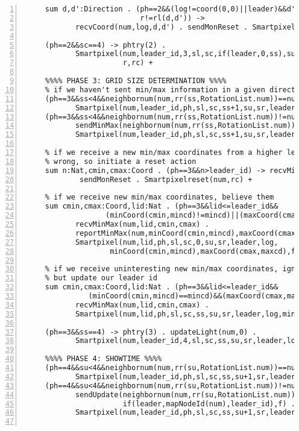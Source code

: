 \begin{Verbatim}[frame=lines,numbers=left,fontfamily=courier,fontsize=\footnotesize]
     % if we receive a position and the coordinates are ok but the direction is not, reset
     sum d,d':Direction . (ph==2&&(log!=coord(0,0)||leader)&&d'==rl(d,RotationList.num)&&
                           r!=rl(d,d')) ->
            recvCoord(num,log,d,d') . sendMonReset . Smartpixelreset(num,rc) +

     (ph==2&&sc==4) -> phtry(2) .
            Smartpixel(num,leader_id,3,sl,sc,if(leader,0,ss),su,sr,leader,log,log,log,f,
                       r,rc) +

     %%%% PHASE 3: GRID SIZE DETERMINATION %%%%
     % if we haven't sent min/max information in a given direction, do so
     (ph==3&&ss<4&&neighbornum(num,rr(ss,RotationList.num))==num) -> intern .
            Smartpixel(num,leader_id,ph,sl,sc,ss+1,su,sr,leader,log,mincd,maxcd,f,r,rc) +
     (ph==3&&ss<4&&neighbornum(num,rr(ss,RotationList.num))!=num) ->
            sendMinMax(neighbornum(num,rr(ss,RotationList.num)),leader_id,mincd,maxcd) .
            Smartpixel(num,leader_id,ph,sl,sc,ss+1,su,sr,leader,log,mincd,maxcd,f,r,rc) +

     % if we receive a new min/max coordinates from a higher leader id, this is
     % wrong, so initiate a reset action
     sum n:Nat,cmin,cmax:Coord . (ph==3&&n>leader_id) -> recvMinMax(num,n,cmin,cmax) .
             sendMonReset . Smartpixelreset(num,rc) +

     % if we receive new min/max coordinates, believe them
     sum cmin,cmax:Coord,lid:Nat . (ph==3&&lid<=leader_id&&
                   (minCoord(cmin,mincd)!=mincd)||(maxCoord(cmax,maxcd)!=maxcd)) ->
            recvMinMax(num,lid,cmin,cmax) .
            reportMinMax(num,minCoord(cmin,mincd),maxCoord(cmax,maxcd)) .
            Smartpixel(num,lid,ph,sl,sc,0,su,sr,leader,log,
                    minCoord(cmin,mincd),maxCoord(cmax,maxcd),f,r,rc) +

     % if we receive uninteresting new min/max coordinates, ignore them
     % but update our leader id
     sum cmin,cmax:Coord,lid:Nat . (ph==3&&lid<=leader_id&&
               (minCoord(cmin,mincd)==mincd)&&(maxCoord(cmax,maxcd)==maxcd)) ->
            recvMinMax(num,lid,cmin,cmax) .
            Smartpixel(num,lid,ph,sl,sc,ss,su,sr,leader,log,mincd,maxcd,f,r,rc) +

     (ph==3&&ss==4) -> phtry(3) . updateLight(num,0) .
            Smartpixel(num,leader_id,4,sl,sc,ss,su,sr,leader,log,log,log,f,r,rc) +

     %%%% PHASE 4: SHOWTIME %%%%
     (ph==4&&su<4&&neighbornum(num,rr(su,RotationList.num))==num) -> intern .
            Smartpixel(num,leader_id,ph,sl,sc,ss,su+1,sr,leader,log,mincd,maxcd,f,r,rc) +
     (ph==4&&su<4&&neighbornum(num,rr(su,RotationList.num))!=num) ->
            sendUpdate(neighbornum(num,rr(su,RotationList.num)),
                       if(leader,mapNodeId(num),leader_id),f) .
            Smartpixel(num,leader_id,ph,sl,sc,ss,su+1,sr,leader,log,mincd,maxcd,f,r,rc) +


\end{Verbatim}
